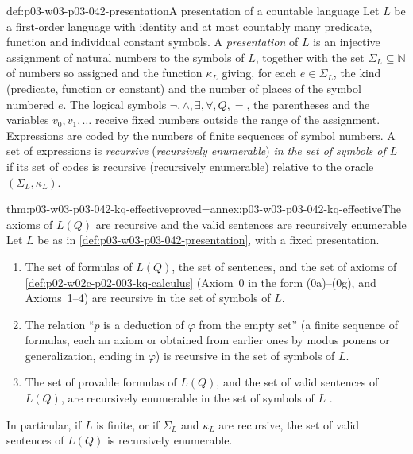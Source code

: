 \begin{hbdefinition}{def:p03-w03-p03-042-presentation}{A presentation of a countable language}
Let \(L\) be a first-order language with identity and at most countably
many predicate, function and individual constant symbols.  A
\emph{presentation} of \(L\) is an injective assignment of natural numbers
to the symbols of \(L\), together with the set \(\Sigma_L\subseteq\mathbb
N\) of numbers so assigned and the function \(\kappa_L\) giving, for each
\(e\in\Sigma_L\), the kind (predicate, function or constant) and the
number of places of the symbol numbered \(e\).  The logical symbols
\(\neg,\land,\exists,\forall,Q,=\), the parentheses and the variables
\(v_0,v_1,\ldots\) receive fixed numbers outside the range of the
assignment.  Expressions are coded by the numbers of finite sequences of
symbol numbers.  A set of expressions is \emph{recursive}
(\emph{recursively enumerable}) \emph{in the set of symbols of \(L\)} if
its set of codes is recursive (recursively enumerable) relative to the
oracle \((\Sigma_L,\kappa_L)\).
\end{hbdefinition}

\begin{hbtheorem}{thm:p03-w03-p03-042-kq-effective}{proved=annex:p03-w03-p03-042-kq-effective}{The axioms of \(L(Q)\) are recursive and the valid sentences are recursively enumerable}
Let \(L\) be as in \cref{def:p03-w03-p03-042-presentation}, with a fixed
presentation.
\begin{enumerate}
\item The set of formulas of \(L(Q)\), the set of sentences, and the set
      of axioms of \cref{def:p02-w02c-p02-003-kq-calculus} (Axiom~0 in the
      form (0a)--(0g), and Axioms~1--4) are recursive in the set of symbols
      of \(L\).
\item The relation ``\(p\) is a deduction of \(\varphi\) from the empty
      set'' (a finite sequence of formulas, each an axiom or obtained from
      earlier ones by modus ponens or generalization, ending in
      \(\varphi\)) is recursive in the set of symbols of \(L\).
\item The set of provable formulas of \(L(Q)\), and the set of valid
      sentences of \(L(Q)\), are recursively enumerable in the set of
      symbols of \(L\) \cite[\S2, Corollary~2.10, p.~26]{Keisler1970}.
\end{enumerate}
In particular, if \(L\) is finite, or if \(\Sigma_L\) and \(\kappa_L\) are
recursive, the set of valid sentences of \(L(Q)\) is recursively
enumerable.
\end{hbtheorem}

